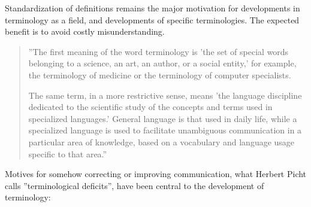 \documentclass[graybox,envcountchap,sectrefs]{svmono}
\begin{document}
Standardization of definitions remains the major motivation for developments in terminology as a field, and developments of specific terminologies. The expected benefit is to avoid costly misunderstanding.



\begin{quote}
''The first meaning of the word terminology is 'the set of special
words belonging to a science, an art, an author, or a social entity,'
for example, the terminology of medicine or the terminology of
computer specialists.
 
The same term, in a more restrictive sense, means 'the language
discipline dedicated to the scientific study of the concepts and terms
used in specialized languages.' General language is that used in
daily life, while a specialized language is used to facilitate
unambiguous communication in a particular area of knowledge,
based on a vocabulary and language usage specific to that area.'' \cite{pavel2001precis}
\end{quote}

Motives for somehow correcting or improving communication, what Herbert Picht calls ''terminological deficits'', have been central to the development of terminology:
\end{document}
